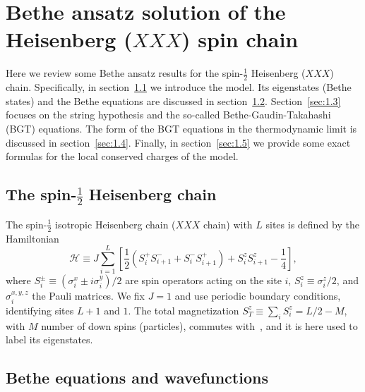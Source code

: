 \documentclass[11pt]{iopart}
\begin{document}
\section{Bethe ansatz solution of the Heisenberg ($XXX$) spin chain}
\label{sec:1}

Here we review some Bethe ansatz results for the spin-$\frac{1}{2}$ Heisenberg 
($XXX$) chain. Specifically, in section~\ref{sec:1.1} we introduce the model. 
Its eigenstates (Bethe states) and the Bethe equations are discussed in 
section~\ref{sec:1.2}. Section~\ref{sec:1.3} focuses on the string hypothesis 
and the so-called Bethe-Gaudin-Takahashi (BGT) equations. The form of the 
BGT equations in the thermodynamic limit is discussed in section~\ref{sec:1.4}. 
Finally, in section~\ref{sec:1.5} we provide some exact formulas for the 
local conserved charges of the model. 


\subsection{The spin-$\frac{1}{2}$ Heisenberg chain}
\label{sec:1.1}

The spin-$\frac{1}{2}$ isotropic Heisenberg chain ($XXX$ chain) with $L$ sites 
is defined by the Hamiltonian 
%
\begin{equation}
\label{xxx-ham}
{\mathcal H}\equiv J\sum\limits_{i=1}^L\left[\frac{1}{2}(S_i^+S^-_{i+1} 
+S_i^{-}S_{i+1}^+)+S_i^zS_{i+1}^z-\frac{1}{4}\right],  
\end{equation}
%
where $S^{\pm}_i\equiv (\sigma_i^x\pm i\sigma_i^y)/2$ are spin operators acting on the 
site $i$, $S_i^z\equiv\sigma_i^z/2$, and $\sigma^{x,y,z}_i$ the Pauli matrices. We fix 
$J=1$ and use periodic boundary conditions, identifying sites $L+1$ and $1$. The total 
magnetization $S_{T}^z\equiv\sum_iS_i^z=L/2-M$, with $M$ number of down spins (particles), 
commutes with~, and it is here used to label its eigenstates. 


\subsection{Bethe equations and wavefunctions}
\label{sec:1.2}
\end{document}
